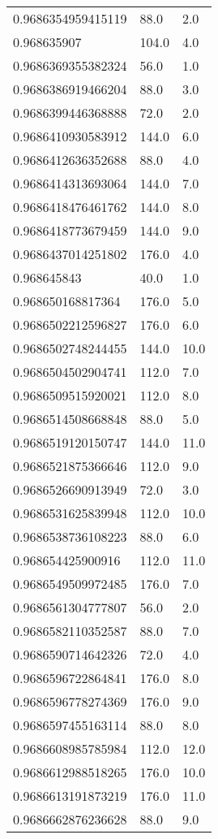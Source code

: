 \begin{center}
\begin{supertabular}[H]{p{0.30\textwidth}p{0.05\textwidth}p{0.05\textwidth}}
0.9686354959415119 & 88.0 & 2.0 \\ 
0.968635907 & 104.0 & 4.0 \\ 
0.9686369355382324 & 56.0 & 1.0 \\ 
0.9686386919466204 & 88.0 & 3.0 \\ 
0.9686399446368888 & 72.0 & 2.0 \\ 
0.9686410930583912 & 144.0 & 6.0 \\ 
0.9686412636352688 & 88.0 & 4.0 \\ 
0.9686414313693064 & 144.0 & 7.0 \\ 
0.9686418476461762 & 144.0 & 8.0 \\ 
0.9686418773679459 & 144.0 & 9.0 \\ 
0.9686437014251802 & 176.0 & 4.0 \\ 
0.968645843 & 40.0 & 1.0 \\ 
0.968650168817364 & 176.0 & 5.0 \\ 
0.9686502212596827 & 176.0 & 6.0 \\ 
0.9686502748244455 & 144.0 & 10.0 \\ 
0.9686504502904741 & 112.0 & 7.0 \\ 
0.9686509515920021 & 112.0 & 8.0 \\ 
0.9686514508668848 & 88.0 & 5.0 \\ 
0.9686519120150747 & 144.0 & 11.0 \\ 
0.9686521875366646 & 112.0 & 9.0 \\ 
0.9686526690913949 & 72.0 & 3.0 \\ 
0.9686531625839948 & 112.0 & 10.0 \\ 
0.9686538736108223 & 88.0 & 6.0 \\ 
0.968654425900916 & 112.0 & 11.0 \\ 
0.9686549509972485 & 176.0 & 7.0 \\ 
0.9686561304777807 & 56.0 & 2.0 \\ 
0.9686582110352587 & 88.0 & 7.0 \\ 
0.9686590714642326 & 72.0 & 4.0 \\ 
0.9686596722864841 & 176.0 & 8.0 \\ 
0.9686596778274369 & 176.0 & 9.0 \\ 
0.9686597455163114 & 88.0 & 8.0 \\ 
0.9686608985785984 & 112.0 & 12.0 \\ 
0.9686612988518265 & 176.0 & 10.0 \\ 
0.9686613191873219 & 176.0 & 11.0 \\ 
0.9686662876236628 & 88.0 & 9.0 \\ 

\end{supertabular}
\end{center}
